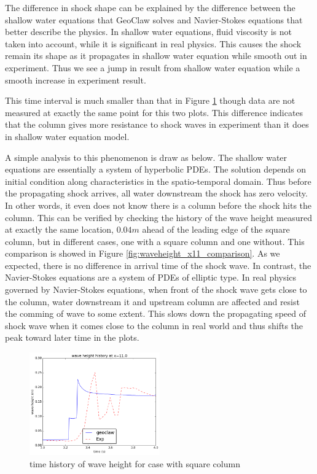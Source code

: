 \documentclass[11pt]{article}
\begin{document}
The difference in shock shape can be explained by the difference between the shallow water equations that GeoClaw solves and Navier-Stokes equations that better describe the physics.
In shallow water equations, fluid viscosity is not taken into account, while it is significant in real physics.
This causes the shock remain its shape as it propagates in shallow water equation while smooth out in experiment.
Thus we see a jump in result from shallow water equation while a smooth increase in experiment result.
\par
This time interval is much smaller than that in Figure \ref{fig:waveheight_square_x=11.0} though data are not measured at exactly the same point for this two plots. 
This difference indicates that the column gives more resistance to shock waves in experiment than it does in shallow water equation model. 
\par
A simple analysis to this phenomenon is draw as below.
The shallow water equations are essentially a system of hyperbolic PDEs. The solution depends on initial condition along characteristics in the spatio-temporal domain. 
Thus before the propagating shock arrives, all water downstream the shock has zero velocity. 
In other words, it even does not know there is a column before the shock hits the column.
This can be verified by checking the history of the wave height measured at exactly the same location, $0.04m$ ahead of the leading edge of the square column, but in different cases, one with a square column and one without.
This comparison is showed in Figure \ref{fig:waveheight_x11_comparison}. As we expected, there is no difference in arrival time of the shock wave.
In contrast, the Navier-Stokes equations are a system of PDEs of elliptic type. 
In real physics governed by Navier-Stokes equations, when front of the shock wave gets close to the column, water downstream it and upstream column are affected and resist the comming of wave to some extent. 
This slows down the propagating speed of shock wave when it comes close to the column in real world and thus shifts the peak toward later time in the plots.
\begin{figure}[h!]
    \centering
    \includegraphics[width=0.5\textwidth]{./plots/waveheight_square_x11}
    \caption{time history of wave height for case with square column}
    \label{fig:waveheight_square_x=11.0}
\end{figure}
\end{document}
